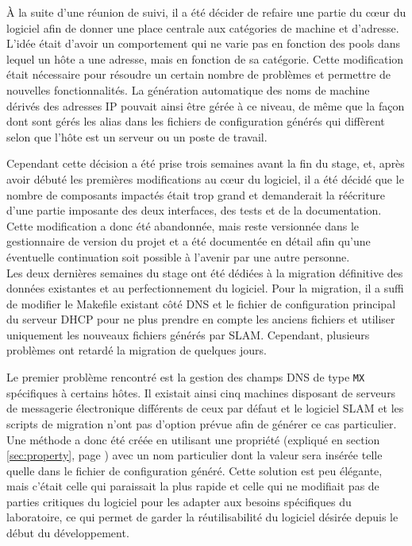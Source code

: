 \documentclass[12pt,a4paper,twoside]{report}
\begin{document}
À la suite d’une réunion de suivi, il a été décider de refaire une partie du
cœur du logiciel afin de donner une place centrale aux catégories de machine et
d’adresse. L’idée était d’avoir un comportement qui ne varie pas en fonction
des pools dans lequel un hôte a une adresse, mais en fonction de sa catégorie.
Cette modification était nécessaire pour résoudre un certain nombre de
problèmes et permettre de nouvelles fonctionnalités. La génération automatique
des noms de machine dérivés des adresses IP pouvait ainsi être gérée à ce
niveau, de même que la façon dont sont gérés les alias dans les fichiers de
configuration générés qui diffèrent selon que l’hôte est un serveur ou un poste
de travail.
\label{sec:newmodel}

Cependant cette décision a été prise trois semaines avant la fin du stage, et,
après avoir débuté les premières modifications au cœur du logiciel, il a été
décidé que le nombre de composants impactés était trop grand et demanderait la
réécriture d’une partie imposante des deux interfaces, des tests et de la
documentation. Cette modification a donc été abandonnée, mais reste versionnée
dans le gestionnaire de version du projet et a été documentée en détail afin
qu’une éventuelle continuation soit possible à l’avenir par une autre
personne.\\

Les deux dernières semaines du stage ont été dédiées à la migration définitive
des données existantes et au perfectionnement du logiciel. Pour la migration,
il a suffi de modifier le Makefile existant côté DNS et le fichier de
configuration principal du serveur DHCP pour ne plus prendre en compte les
anciens fichiers et utiliser uniquement les nouveaux fichiers générés par SLAM.
Cependant, plusieurs problèmes ont retardé la migration de quelques jours.

Le premier problème rencontré est la gestion des champs DNS de type \verb+MX+
spécifiques à certains hôtes. Il existait ainsi cinq machines disposant de
serveurs de messagerie électronique différents de ceux par défaut et le
logiciel SLAM et les scripts de migration n’ont pas d’option prévue afin de
générer ce cas particulier. Une méthode a donc été créée en utilisant une
propriété (expliqué en section \ref{sec:property}, page \pageref{sec:property})
avec un nom particulier dont la valeur sera insérée telle quelle dans le
fichier de configuration généré. Cette solution est peu élégante, mais c’était
celle qui paraissait la plus rapide et celle qui ne modifiait pas de parties
critiques du logiciel pour les adapter aux besoins spécifiques du laboratoire,
ce qui permet de garder la réutilisabilité du logiciel désirée depuis le début
du développement.
\end{document}
